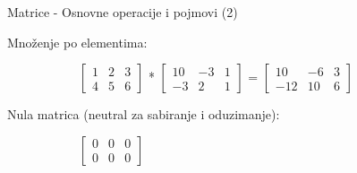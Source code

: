 \documentclass[bookmarks=true,bookmarksopen=true,pdfborder={0 0 0},pdfhighlight={/N},linkbordercolor={.5 .5 .5},implicit=false,unicode,xcolor={table}]{beamer}
\begin{document}
\begin{frame}{Matrice - Osnovne operacije i pojmovi (2)}

  Množenje po elementima:
  \begin{figure}
    \begin{subfigure}{9cm}
      $\begin{bmatrix}
        1 & 2 & 3\\
        4 & 5 & 6
        \end{bmatrix}$
      * 
      $\begin{bmatrix}
        10 & -3 & 1\\
        -3 & 2 & 1
        \end{bmatrix}$
      =
      $\begin{bmatrix}
        10 & -6 & 3\\
        -12 & 10 & 6
        \end{bmatrix}$
    \end{subfigure}
  \end{figure}

  Nula matrica (neutral za sabiranje i oduzimanje):
  \begin{figure}
    \begin{subfigure}{9cm}
      $\begin{bmatrix}
        0 & 0 & 0\\
        0 & 0 & 0
        \end{bmatrix}$
    \end{subfigure}
  \end{figure}

\end{frame}
\end{document}

